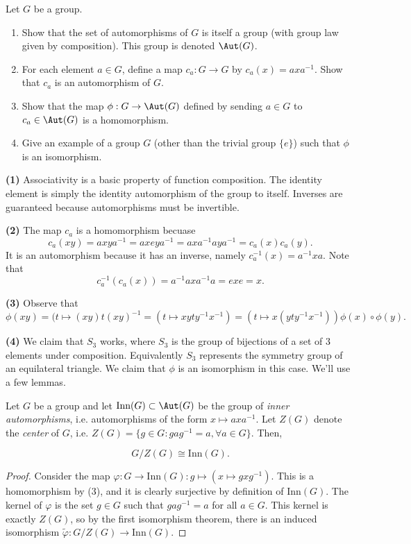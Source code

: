 \documentclass[11pt,letterpaper]{article}
\begin{document}
\pagebreak
\begin{problem}
  Let $G$ be a group.

  \begin{enumerate}
    \item Show that the set of automorphisms of $G$ is itself a group (with group law given by composition). This group is denoted $\Aut(G)$.
    \item For each element $a\in G$, define a map $c_a:G\to G$ by $c_a(x)=axa^{-1}$. Show that $c_a$ is an automorphism of $G$.
    \item Show that the map $\phi:G\to \Aut(G)$ defined by sending $a\in G$ to $c_a\in \Aut(G)$ is a homomorphism.
    \item Give an example of a group $G$ (other than the trivial group $\{e\}$) such that $\phi$ is an isomorphism.
  \end{enumerate}
\end{problem}

\textbf{(1)} Associativity is a basic property of function composition. The identity element is simply the identity automorphism of the group to itself. Inverses are guaranteed because automorphisms must be invertible.

\textbf{(2)} The map $c_a$ is a homomorphism becuase 
  \[c_a(xy) = axya^{-1} = axeya^{-1}=axa^{-1}aya^{-1}=c_a(x)c_a(y).\] It is an automorphism because it has an inverse, namely $c_a^{-1}(x) = a^{-1}xa$. Note that 
  \[c_a^{-1}(c_a(x)) = a^{-1}axa^{-1}a = exe=x.\]

\textbf{(3)} Observe that
\[ \phi(xy)=(t \mapsto (xy)t(xy)^{-1} = (t\mapsto xyty^{-1}x^{-1}) = (t\mapsto x(yty^{-1}x^{-1}))\phi(x)\circ\phi(y). \]

\textbf{(4)} We claim that $S_3$ works, where $S_3$ is the group of bijections of a set of $3$ elements under composition. Equivalently $S_3$ represents the symmetry group of an equilateral triangle. We claim that $\phi$ is an isomorphism in this case. We'll use a few lemmas.

\begin{lemma}\label{inneraut}
  Let $G$ be a group and let $\textrm{Inn}(G)\subset \Aut(G)$ be the group of {\em{inner automorphisms}}, i.e. automorphisms of the form $x \mapsto axa^{-1}$. Let $Z(G)$ denote the {\em{center}} of $G$, i.e. $Z(G)=\{ g\in G : gag^{-1} = a, \forall a\in G\}.$ Then,

  \[ G / Z(G) \cong \textrm{Inn}(G).\]
\end{lemma}
\begin{proof}
  Consider the map $\varphi : G \to \textrm{Inn}(G) : g \mapsto (x \mapsto gxg^{-1})$. This is a homomorphism by (3), and it is clearly surjective by definition of $\textrm{Inn}(G)$. The kernel of $\varphi$ is the set $g\in G$ such that $gag^{-1} = a$ for all $a\in G$. This kernel is exactly $Z(G)$, so by the first isomorphism theorem, there is an induced isomorphism $\tilde{\varphi} : G / Z(G) \to \textrm{Inn}(G)$.   
\end{proof}
\end{document}
